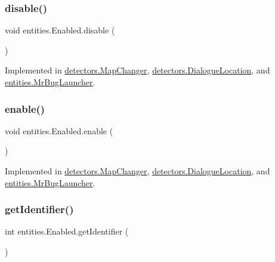 \subsubsection{\texorpdfstring{disable()}{disable()}}
{\footnotesize\ttfamily void entities.\+Enabled.\+disable (\begin{DoxyParamCaption}{ }\end{DoxyParamCaption})}



Implemented in \mbox{\hyperlink{classdetectors_1_1_map_changer_abc1c02ba44ab3c41c5281d4eb18eab63}{detectors.\+Map\+Changer}}, \mbox{\hyperlink{classdetectors_1_1_dialogue_location_a6291ee1ebe1a42ba222707cd118ca5a7}{detectors.\+Dialogue\+Location}}, and \mbox{\hyperlink{classentities_1_1_mr_bug_launcher_a79e2867ec5db217d1b291e9331e7b0ca}{entities.\+Mr\+Bug\+Launcher}}.

\mbox{\label{interfaceentities_1_1_enabled_a0c6a44be8f9b87d4e0ddf93dad67232a}} 
\subsubsection{\texorpdfstring{enable()}{enable()}}
{\footnotesize\ttfamily void entities.\+Enabled.\+enable (\begin{DoxyParamCaption}{ }\end{DoxyParamCaption})}



Implemented in \mbox{\hyperlink{classdetectors_1_1_map_changer_ac62f6efb8dbbbf91ca21b3789de4f755}{detectors.\+Map\+Changer}}, \mbox{\hyperlink{classdetectors_1_1_dialogue_location_ae5b1e547c67f1b2f61e3b2b0b5dedbc4}{detectors.\+Dialogue\+Location}}, and \mbox{\hyperlink{classentities_1_1_mr_bug_launcher_a5ed27f4fcd413382a04c839e90e5e493}{entities.\+Mr\+Bug\+Launcher}}.

\mbox{\label{interfaceentities_1_1_enabled_afbf595b80729c70944d508375ea7a5fd}} 
\subsubsection{\texorpdfstring{get\+Identifier()}{getIdentifier()}}
{\footnotesize\ttfamily int entities.\+Enabled.\+get\+Identifier (\begin{DoxyParamCaption}{ }\end{DoxyParamCaption})}



